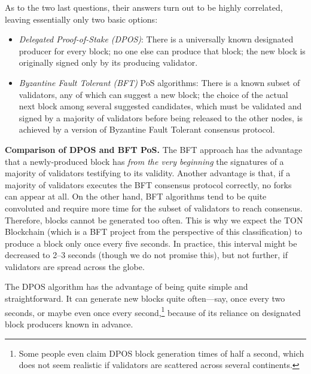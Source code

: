\documentclass[12pt,oneside]{article}
\def\makepoint#1{\medbreak\noindent{\bf #1.\ }}
\def\nxsubpoint{\refstepcounter{subsubsection}%
  \smallbreak\makepoint{\thesubsubsection}}
\def\embt(#1.){\textbf{#1.}}
\begin{document}
As to the two last questions, their answers turn out to be highly
correlated, leaving essentially only two basic options:
\begin{itemize}
\item {\em Delegated Proof-of-Stake (DPOS)}: There is a universally
  known designated producer for every block; no one else can produce
  that block; the new block is originally signed only by its producing
  validator.
\item {\em Byzantine Fault Tolerant (BFT)} PoS algorithms: There is a
  known subset of validators, any of which can suggest a new block;
  the choice of the actual next block among several suggested
  candidates, which must be validated and signed by a majority of
  validators before being released to the other nodes, is achieved by
  a version of Byzantine Fault Tolerant consensus protocol.
\end{itemize}

\nxsubpoint\label{sp:dpos.bft.compare} \embt(Comparison of DPOS and
BFT PoS.)  The BFT approach has the advantage that a newly-produced
block has {\em from the very beginning\/} the signatures of a majority
of validators testifying to its validity. Another advantage is that,
if a majority of validators executes the BFT consensus protocol
correctly, no forks can appear at all. On the other hand, BFT
algorithms tend to be quite convoluted and require more time for the
subset of validators to reach consensus. Therefore, blocks cannot be
generated too often. This is why we expect the TON Blockchain (which
is a BFT project from the perspective of this classification) to
produce a block only once every five seconds. In practice, this
interval might be decreased to 2--3 seconds (though we do not promise
this), but not further, if validators are spread across the globe.

The DPOS algorithm has the advantage of being quite simple and
straightforward. It can generate new blocks quite often---say, once
every two seconds, or maybe even once every second,\footnote{Some
  people even claim DPOS block generation times of half a second,
  which does not seem realistic if validators are scattered across
  several continents.} because of its reliance on designated block
producers known in advance.
\end{document}
